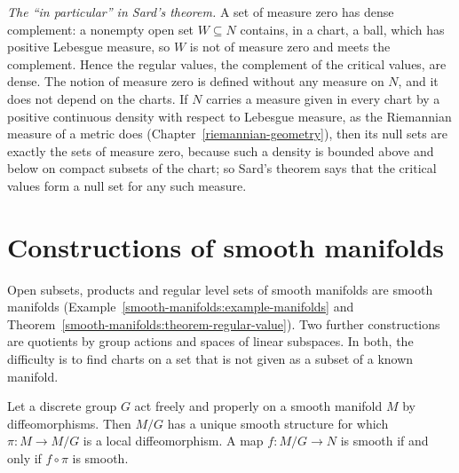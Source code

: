 \begin{remark}\label{smooth-manifolds:remark-sard}
\emph{The ``in particular'' in Sard's theorem.} A set of measure zero has dense complement: a nonempty open set $W \subseteq N$ contains, in a chart, a ball, which has positive Lebesgue measure, so
$W$ is not of measure zero and meets the complement. Hence the regular values, the complement of the critical values, are dense. The notion of measure zero is defined without any measure on
$N$, and it does not depend on the charts. If $N$ carries a measure given in every chart by a positive continuous density with respect to Lebesgue measure, as the Riemannian measure of a metric
does (Chapter~\ref{riemannian-geometry}), then its null sets are exactly the sets of measure zero, because such a density is bounded above and below on compact subsets of the chart; so Sard's theorem
says that the critical values form a null set for any such measure.
\end{remark}

\section{Constructions of smooth manifolds}\label{smooth-manifolds:section-constructions}

Open subsets, products and regular level sets of smooth manifolds are smooth manifolds (Example~\ref{smooth-manifolds:example-manifolds} and
Theorem~\ref{smooth-manifolds:theorem-regular-value}). Two further constructions are quotients by group actions and spaces of linear subspaces. In both, the
difficulty is to find charts on a set that is not given as a subset of a known manifold.

\begin{theorem}\label{smooth-manifolds:theorem-smooth-quotient}
Let a discrete group $G$ act freely and properly on a smooth manifold $M$ by diffeomorphisms. Then $M/G$ has a unique smooth structure for which $\pi \colon M \to M/G$ is a local diffeomorphism. A map $f \colon M/G \to N$ is smooth if
and only if $f \circ \pi$ is smooth.
\end{theorem}

